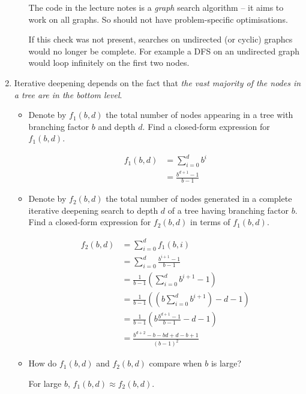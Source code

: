 \documentclass[10pt,\jkfside,a4paper]{article}
\begin{document}
\begin{enumerate}
\begin{enumerate}[label=(\alph*)]
The code in the lecture notes is a \textit{graph} search algorithm -- it
aims to work on all graphs. So should not have problem-specific
optimisations.

If this check was not present, searches on undirected (or cyclic) graphcs
would no longer be complete. For example a DFS on an undirected graph would
loop infinitely on the first two nodes.

\end{enumerate}

\item Iterative deepening depends on the fact that \textit{the vast majority of
the nodes in a tree are in the bottom level}.

\begin{itemize}

\item Denote by $f_1(b, d)$ the total number of nodes appearing in a tree
with branching factor $b$ and depth $d$. Find a closed-form expression for
$f_1(b, d)$.

\[
\begin{split}
f_1(b, d)
&= \sum^d_{i=0} b^i \\
&= \frac{b^{d + 1} - 1}{b - 1}
\end{split}
\]

\item Denote by $f_2(b, d)$ the total number of nodes generated in a
complete iterative deepening search to depth $d$ of a tree having branching
factor $b$. Find a closed-form expression for $f_2(b, d)$ in terms of
$f_1(b, d)$.

\[
\begin{split}
f_2(b, d)
&= \sum^{d}_{i=0} f_1(b, i) \\
&= \sum^{d}_{i=0} \frac{b^{i + 1} - 1}{b - 1} \\
&= \frac{1}{b - 1} \left( \sum^{d}_{i=0} b^{i+1} - 1 \right) \\
&= \frac{1}{b - 1} \left(\left(b\sum^{d}_{i=0} b^{i+1}\right) - d - 1\right) \\
&= \frac{1}{b-1}\left( b\frac{b^{d + 1} - 1}{b - 1} - d - 1\right) \\
&= \frac{b^{d + 2} - b - bd + d - b + 1}{(b - 1)^2}
\end{split}
\]

\item How do $f_1(b, d)$ and $f_2(b, d)$ compare when $b$ is large?

For large $b$, $f_1(b, d) \approx f_2(b, d)$.

\end{itemize}


\end{enumerate}
\end{document}
